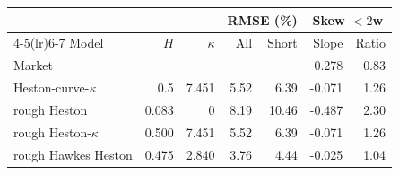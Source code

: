 \begin{tabular}{lrrrrrr}
\toprule
 & & & \multicolumn{2}{c}{RMSE (\%)} & \multicolumn{2}{c}{Skew $<2$w}\\
\cmidrule(lr){4-5}\cmidrule(lr){6-7}
Model & $H$ & $\kappa$ & All & Short & Slope & Ratio\\
\midrule
Market & & & & & 0.278 & 0.83\\
\addlinespace
Heston-curve-$\kappa$ & 0.5 & 7.451 & 5.52 & 6.39 & -0.071 & 1.26\\
rough Heston & 0.083 & 0 & 8.19 & 10.46 & -0.487 & 2.30\\
rough Heston-$\kappa$ & 0.500 & 7.451 & 5.52 & 6.39 & -0.071 & 1.26\\
rough Hawkes Heston & 0.475 & 2.840 & 3.76 & 4.44 & -0.025 & 1.04\\
\bottomrule
\end{tabular}
